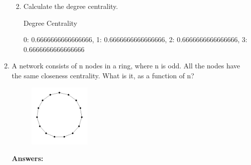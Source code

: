 \documentclass{amsart}
\theoremstyle{definition}
\theoremstyle{remark}
\numberwithin{equation}{section}
\begin{document}
\begin{enumerate}
\begin{enumerate}

\vspace{0.2cm}
\item Calculate the degree centrality. \vspace{0.2cm}

Degree Centrality

{0: 0.6666666666666666, 1: 0.6666666666666666, 2: 0.6666666666666666, 3: 0.6666666666666666}


\vspace{0.2cm}
\end{enumerate}
\clearpage

\item A network consists of n nodes in a ring, where n is odd. All the nodes have the same closeness centrality. What is it, as a function of n? \vspace{0.2cm}


\begin{figure}[h]
\includegraphics[width=0.2\linewidth]{images/hw3_figure1.PNG}
\end{figure}

\vspace{0.2cm}

\textbf{Answers:}

\vspace{0.2cm}


\end{enumerate}
\end{document}
